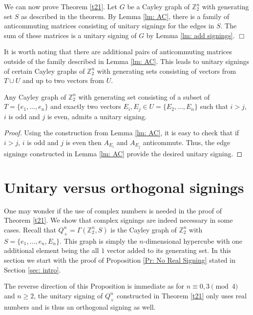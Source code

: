We can now prove Theorem \ref{t21}. Let $G$ be a 
Cayley graph of ${\mathbb{Z}_{2}^{n}}$ with generating 
set $S$ as described in the theorem.
By Lemma \ref{lm: AC}, there is a family of anticommuting matrices 
consisting of unitary signings for the edges in $S$. The sum of 
these matrices is a unitary signing of $G$ by Lemma \ref{lm: add signings}.
\hfill  $\Box$

It is worth noting that there are additional pairs of anticommuting 
matrices outside of the family described in Lemma \ref{lm: AC}. 
This leads to unitary signings of certain Cayley graphs 
of ${\mathbb{Z}_{2}^{n}}$ with generating sets consisting of vectors 
from $T \cup U$ and up to two vectors from $U$. 

\begin{coro}
Any Cayley graph of ${\mathbb{Z}_{2}^{n}}$ with generating set consisting of a 
subset of $T = \{e_1, \ldots, e_n\}$ and exactly two 
vectors $E_i, E_j \in U = \{E_2, \ldots, E_n \}$ 
such that $i > j$, $i$ is odd and $j$ is even, admits a unitary signing.
\end{coro}
\begin{proof}
Using the construction from 
Lemma \ref{lm: AC}, it is easy to check that if $i > j$, $i$ is odd 
and $j$ is even then $A_{E_i}$ and $A_{E_j}$ anticommute. 
Thus, the edge signings constructed in Lemma \ref{lm: AC} 
provide the desired unitary signing. 
\end{proof}


\section{Unitary versus orthogonal signings} \label{sec: un vs or}

One may wonder if the use of complex numbers is needed in the
proof of Theorem \ref{t21}.
We show that complex signings are indeed necessary in some 
cases.  Recall that 
$Q_{+}^{n} = \Gamma(\mathbb{Z}_{2}^{n}, S)$ is the Cayley graph
of $\mathbb{Z}_{2}^{n}$
with $S = \{e_1, \ldots, e_n, E_n \}$. This graph is simply 
the $n$-dimensional hypercube with one additional element being the
all $1$ vector added 
to its generating set. 
In this section we start with the proof of Proposition 
\ref{Pr: No Real Signing} stated in Section \ref{sec: intro}.
    
The reverse direction of this Proposition 
is immediate as for $n \equiv 0,3 \pmod{4}$ and $n \geq 2$, 
the unitary signing of $Q_+^n$ constructed in Theorem \ref{t21} 
only uses real numbers and is thus an orthogonal signing as well.

